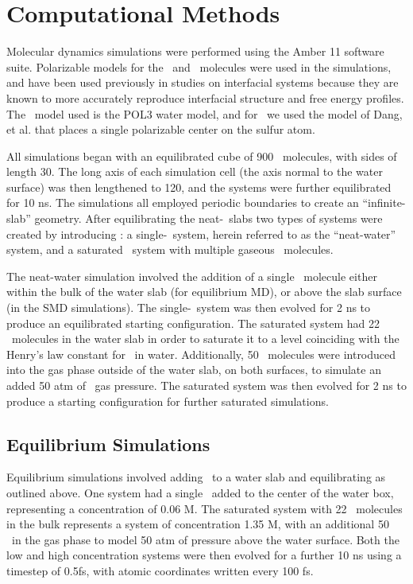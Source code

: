 \section{Computational Methods}

Molecular dynamics simulations were performed using the Amber 11 software suite.\cite{Case2010} Polarizable models for the \wat~and \suldiox~molecules were used in the simulations, and have been used previously in studies on interfacial systems because they are known to more accurately reproduce interfacial structure and free energy profiles.\cite{Wick2007,Rivera2006,Dang1998} The \wat~model used is the POL3 water model,\cite{Caldwell1995} and for \suldiox~we used the model of Dang, et al. that places a single polarizable center on the sulfur atom.\cite{Baer2010}

All simulations began with an equilibrated cube of 900 \wat~molecules, with sides of length 30\angs. The long axis of each simulation cell (the axis normal to the water surface) was then lengthened to 120\angs, and the systems were further equilibrated for 10 ns. The simulations all employed periodic boundaries to create an ``infinite-slab'' geometry. After equilibrating the neat-\wat~slabs two types of systems were created by introducing \suldiox: a single-\suldiox~system, herein referred to as the ``neat-water'' system, and a saturated \suldiox~system with multiple gaseous \suldiox~molecules.

The neat-water simulation involved the addition of a single \suldiox~molecule either within the bulk of the water slab (for equilibrium MD), or above the slab surface (in the SMD simulations). The single-\suldiox~system was then evolved for 2 ns to produce an equilibrated starting configuration. The saturated system had 22 \suldiox~molecules in the water slab in order to saturate it to a level coinciding with the Henry's law constant for \suldiox~in water. Additionally, 50 \suldiox~molecules were introduced into the gas phase outside of the water slab, on both surfaces, to simulate an added 50 atm of \suldiox~gas pressure. The saturated system was then evolved for 2 ns to produce a starting configuration for further saturated simulations.

\subsection{Equilibrium Simulations}

Equilibrium simulations involved adding \suldiox~to a water slab and equilibrating as outlined above. One system had a single \suldiox~added to the center of the water box, representing a concentration of 0.06 M. The saturated system with 22 \suldiox~molecules in the bulk represents a system of concentration 1.35 M, with an additional 50 \suldiox~in the gas phase to model 50 atm of pressure above the water surface. Both the low and high concentration systems were then evolved for a further 10 ns using a timestep of 0.5fs, with atomic coordinates written every 100 fs.

